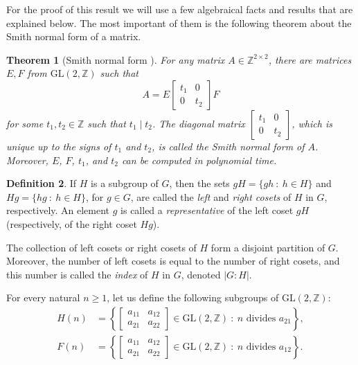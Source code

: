 \documentclass[fontsize=11pt,DIV=13,paper=letter]{scrartcl}
\newtheorem{theorem}{Theorem}\newtheorem{proposition}[theorem]{Proposition}
\theoremstyle{definition}
\newtheorem{definition}[theorem]{Definition}
\newcommand{\Z}{\mathbb{Z}}
\newcommand{\GL}{\mathrm{GL}(2,\Z)}
\begin{document}
For the proof of this result we will use a few algebraical facts and results that are explained below. The most important of them is the following theorem about the Smith normal form of a matrix.

\begin{theorem}[Smith normal form \cite{KB79}] \label{SNF}
For any matrix $A\in \Z^{2\times 2}$, there are matrices $E,F$ from $\GL$ such that
\[
A=E\begin{bmatrix} t_1 & 0\\ 0 & t_2 \end{bmatrix}F
\]
for some $t_1,t_2\in \Z$ such that $t_1 \mid t_2$. The diagonal matrix $\begin{bmatrix} t_1 & 0\\ 0 & t_2 \end{bmatrix}$, which is unique up to the signs of $t_1$ and $t_2$, is called the \emph{Smith normal form} of $A$. Moreover, $E$, $F$, $t_1$, and $t_2$ can be computed in polynomial time.
\end{theorem}

\begin{definition}
If $H$ is a subgroup of $G$, then the sets $gH = \{gh\ :\ h\in H\}$ and $Hg = \{hg\ :\ h\in H\}$, for $g\in G$, are called the \emph{left} and \emph{right cosets} of $H$ in $G$, respectively. An element $g$ is called a \emph{representative} of the left coset $gH$ (respectively, of the right coset $Hg$).

The collection of left cosets or right cosets of $H$ form a disjoint partition of $G$. Moreover, the number of left cosets is equal to the number of right cosets, and this number is called the \emph{index} of $H$ in $G$, denoted $|G:H|$. 
\end{definition}

For every natural $n\geq 1$, let us define the following subgroups of $\GL$:
\[
\begin{split}
H(n) &= \left\{\begin{bmatrix} a_{11} & a_{12}\\ a_{21} & a_{22}\end{bmatrix}\in \GL\ :\ n \text{ divides } a_{21}\right\},\\ 
F(n) &= \left\{\begin{bmatrix} a_{11} & a_{12}\\ a_{21} & a_{22}\end{bmatrix}\in \GL\ :\ n \text{ divides } a_{12}\right\}.
\end{split}
\]
\end{document}
